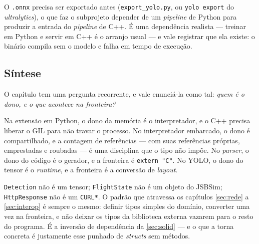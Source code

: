 \begin{armadilha}
O \texttt{.onnx} precisa ser exportado antes (\texttt{export\_yolo.py}, ou
\texttt{yolo export} do \emph{ultralytics}), o que faz o subprojeto depender de
um \emph{pipeline} de Python para produzir a entrada do \emph{pipeline} de C++.
É uma dependência realista --- treinar em Python e servir em C++ é o arranjo
usual --- e vale registrar que ela existe: o binário compila sem o modelo e
falha em tempo de execução.
\end{armadilha}

\subsection{Síntese}

O capítulo tem uma pergunta recorrente, e vale enunciá-la como tal: \emph{quem é
o dono, e o que acontece na fronteira?}

Na extensão em Python, o dono da memória é o interpretador, e o C++ precisa
liberar o GIL para não travar o processo. No interpretador embarcado, o dono é
compartilhado, e a contagem de referências --- com suas referências próprias,
emprestadas e roubadas --- é uma disciplina que o tipo não impõe. No
\emph{parser}, o dono do código é o gerador, e a fronteira é \texttt{extern "C"}.
No YOLO, o dono do tensor é o \emph{runtime}, e a fronteira é a conversão de
\emph{layout}.

\begin{regra}
\texttt{Detection} não é um tensor; \texttt{FlightState} não é um objeto do
JSBSim; \texttt{HttpResponse} não é um \texttt{CURL*}. O padrão que atravessa os
capítulos \ref{sec:rede} a \ref{sec:interop} é sempre o mesmo: definir tipos
simples do domínio, converter uma vez na fronteira, e não deixar os tipos da
biblioteca externa vazarem para o resto do programa. É a inversão de dependência
da \cref{sec:solid} --- e o que a torna concreta é justamente esse punhado de
\emph{structs} sem métodos.
\end{regra}
